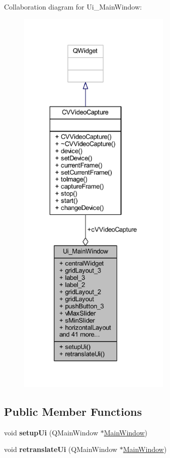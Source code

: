 Collaboration diagram for Ui\+\_\+\+Main\+Window\+:\nopagebreak
\begin{figure}[H]
\begin{center}
\leavevmode
\includegraphics[height=550pt]{d5/d21/class_ui___main_window__coll__graph}
\end{center}
\end{figure}
\subsection*{Public Member Functions}
\begin{DoxyCompactItemize}
\item 
\mbox{\label{class_ui___main_window_acf4a0872c4c77d8f43a2ec66ed849b58}} 
void {\bfseries setup\+Ui} (Q\+Main\+Window $\ast$\hyperlink{class_main_window}{Main\+Window})
\item 
\mbox{\label{class_ui___main_window_a097dd160c3534a204904cb374412c618}} 
void {\bfseries retranslate\+Ui} (Q\+Main\+Window $\ast$\hyperlink{class_main_window}{Main\+Window})
\end{DoxyCompactItemize}
